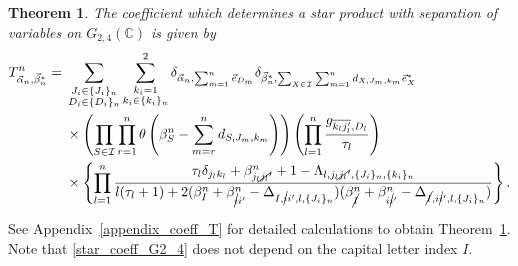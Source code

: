 \documentclass[10pt,a4paper]{amsart}
\numberwithin{equation}{section}
\newtheorem{Theorem}{Theorem}[section]
\begin{document}
\begin{Theorem}\label{thm_star_coeff_G2_4}
The coefficient  which determines a star product with separation of variables on $G_{2,4}(\mathbb{C})$ is given by
\begin{align}
 T^{n}_{\vec{\alpha}_{n},\vec{\beta}_{n}^{\ast}}
 ={}&
 \sum_{
 \substack{
 J_{i}
 \in
 \{
 J_{i}
 \}_{n}
 \\
 D_{i}
 \in
 \{
 D_{i}
 \}_{n}
 }
 }
 \sum_{
 \substack{
 k_{i}=1
 \\
 k_{i}
 \in
 \{
 k_{i}
 \}_{n}
 }
 }^{2}
 \delta_{
 \vec{\alpha}_{n},
 \sum_{m=1}^{n}
 \vec{e}_{D_{m}}
 }
 \delta_{
 \vec{\beta}_{n}^{\ast},
 \sum_{
 X
 \in
 \mathcal{I}
 }
 \sum_{m=1}^{n}
 d_{
 X,
 J_{m},
 k_{m}
 }
 \vec{e}_{X}^{\ast}
 }
 \nonumber
 \\
 &
 \times
 \left(
 \prod_{
 S
 \in
 \mathcal{I}
 }
 \prod_{r=1}^{n}
 \theta
 \left(
 \beta_{S}^{n}
 -
 \sum_{m=r}^{n}
 d_{S,J_{m},k_{m}}
 \right)
 \right)
 \left(
 \prod_{l=1}^{n}
 \frac{g_{\overline{k_{l}j_{l}'},D_{l}}}{\tau_{l}}
 \right)
 \nonumber
 \\
 &
 \times
 \left\{
 \prod_{l=1}^{n}
 \frac{
 \tau_{l}
 \delta_{j_{l}k_{l}}
 +
 \beta_{j_{l}\cancel{j_{l}}'}^{n}
 +
 1
 -
 \Lambda_{
 l,
 j_{l}\cancel{j_{l}}',
 \{
 J_{i}
 \}_{n},
 \{
 k_{i}
 \}_{n}
 }
 }{
 l
 (
 \tau_{l}+1
 )
 +
 2
 (
 \beta_{I}^{n}
 +
 \beta_{\cancel{i}i'}^{n}
 -
 \Delta_{
 I,
 \cancel{i}i',
 l,
 \{
 J_{i}
 \}_{n}
 }
 )
 (
 \beta_{\cancel{I}}^{n}
 +
 \beta_{i\cancel{i}'}^{n}
 -
 \Delta_{
 \cancel{I},
 i\cancel{i}',
 l,
 \{
 J_{i}
 \}_{n}
 }
 )
 }
 \right\}
 .
 \label{star_coeff_G2_4}
\end{align}
\end{Theorem}

See Appendix~\ref{appendix_coeff_T} for detailed calculations to obtain Theorem~\ref{thm_star_coeff_G2_4}. Note that \eqref{star_coeff_G2_4} does not depend on the capital letter index $I$.
\end{document}
